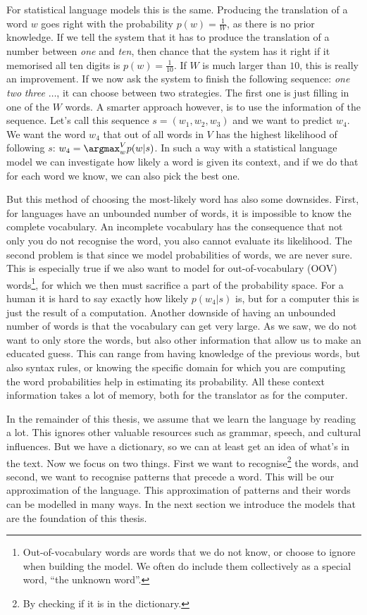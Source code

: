 For statistical language models this is the same. Producing the translation of a word $w$ goes right with the probability $p(w)=\frac{1}{W}$, as there is no prior knowledge. If we tell the system that it has to produce the translation of a number between \emph{one} and \emph{ten}, then chance that the system has it right if it memorised all ten digits is $p(w)=\frac{1}{10}$. If $W$ is much larger than $10$, this is really an improvement. If we now ask the system to finish the following sequence: \emph{one} \emph{two} \emph{three} $\ldots$, it can choose between two strategies. The first one is just filling in one of the $W$ words. A smarter approach however, is to use the information of the sequence. Let's call this sequence $s = (w_1, w_2, w_3)$ and we want to predict $w_4$. We want the word $w_4$ that out of all words in $V$ has the highest likelihood of following $s$: $w_4 = \argmax_{w}^{V} p(w|s)$. In such a way with a statistical language model we can investigate how likely a word is given its context, and if we do that for each word we know, we can also pick the best one.

But this method of choosing the most-likely word has also some downsides. First, for languages have an unbounded number of words, it is impossible to know the complete vocabulary. An incomplete vocabulary has the consequence that not only you do not recognise the word, you also cannot evaluate its likelihood. The second problem is that since we model probabilities of words, we are never sure. This is especially true if we also want to model for out-of-vocabulary (OOV) words\footnote{Out-of-vocabulary words are words that we do not know, or choose to ignore when building the model. We often do include them collectively as a special word, ``the unknown word''.}, for which we then must sacrifice a part of the probability space. For a human it is hard to say exactly how likely $p(w_4|s)$ is, but for a computer this is just the result of a computation. Another downside of having an unbounded number of words is that the vocabulary can get very large. As we saw, we do not want to only store the words, but also other information that allow us to make an educated guess. This can range from having knowledge of the previous words, but also syntax rules, or knowing the specific domain for which you are computing the word probabilities help in estimating its probability. All these context information takes a lot of memory, both for the translator as for the computer.

In the remainder of this thesis, we assume that we learn the language by reading a lot. This ignores other valuable resources such as grammar, speech, and cultural influences. But we have a dictionary, so we can at least get an idea of what's in the text. Now we focus on two things. First we want to recognise\footnote{By checking if it is in the dictionary.} the words, and second, we want to recognise patterns that precede a word. This will be our approximation of the language. This approximation of patterns and their words can be modelled in many ways. In the next section we introduce the models that are the foundation of this thesis.



